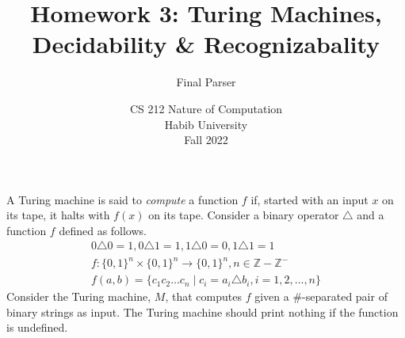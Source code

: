 \documentclass[addpoints]{exam}
\title{Homework 3: Turing Machines, Decidability \& Recognizabality}
\author{Final Parser} %
\date{CS 212 Nature of Computation\\Habib University\\Fall 2022}
\begin{document}
\maketitle

\begin{questions}

\question \label{q:lang} A Turing machine is said to \textit{compute} a function $f$ if, started with an input $x$ on its tape, it halts with $f(x)$ on its tape. Consider a binary operator $\triangle$ and a function $f$ defined as follows.
	\begin{align*}
		0\triangle 0=1, 0\triangle 1=1, 1\triangle 0=0,1\triangle 1=1\\
		f:\{0,1\}^n\times \{0,1\}^n\to \{0,1\}^n, n\in \mathbb{Z}-\mathbb{Z}^-    \\
		f(a,b) = \{ c_1c_2\ldots c_n \mid c_i = a_i\triangle b_i, i = 1,2,\ldots,n\}
	\end{align*}
	Consider the Turing machine, $M$, that computes $f$ given a $\#$-separated pair of binary strings as input. The Turing machine should print nothing if the function is undefined.

\begin{parts}

\end{parts}
\end{questions}
\end{document}
